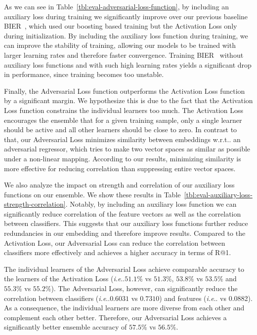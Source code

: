 \documentclass[10pt,journal,compsoc]{IEEEtran}
\makeatletter
\DeclareRobustCommand\onedot{\futurelet\@let@token\@onedot}
\def\@onedot{\ifx\@let@token.\else.\null\fi\xspace}
\def\ie{\emph{i.e}\onedot} \def\Ie{\emph{I.e}\onedot}
\def\wrt{w.r.t\onedot} \def\dof{d.o.f\onedot}
\makeatother
\begin{document}
As we can see in Table~\ref{tbl:eval-adversarial-loss-function}, by including an
auxiliary loss during training we significantly improve over our previous
baseline \ac{BIER}~\cite{opitz2017bier}, which used our boosting based training but the Activation Loss 
only during initialization. By including the auxiliary
loss function during training, we can improve the stability of training,
allowing our models to be trained with larger learning rates and therefore
faster convergence. 
Training \ac{BIER}~\cite{opitz2017bier} without auxiliary loss functions and with such high learning rates
yields a significant drop in performance, since training becomes too unstable.

Finally, the Adversarial Loss
function outperforms the Activation Loss function by a significant margin. We
hypothesize this is due to the fact that the Activation Loss function
constrains the individual learners too much. The Activation Loss encourages 
the ensemble that for a given training sample,
only a single learner should be active and all other learners should be close 
to zero. In contrast to that, our Adversarial Loss minimizes similarity between 
embeddings \wrt an adversarial regressor, which tries to make two vector
spaces as similar as possible under a non-linear mapping. According to our results,
minimizing similarity is more effective for reducing correlation than suppressing entire 
vector spaces.

We also analyze the impact on strength and correlation of our auxiliary loss
functions on our ensemble. We show these results in
Table~\ref{tbl:eval-auxiliary-loss-strength-correlation}. Notably, by including
an auxiliary loss function we can significantly reduce correlation of the
feature vectors as well as the correlation between classifiers. This suggests
that our auxiliary loss functions further reduce redundancies in our embedding
and therefore improve results. Compared to the Activation Loss, our Adversarial Loss
can reduce the correlation between classifiers more effectively and achieves a
higher accuracy in terms of R@1.

The individual learners of the Adversarial Loss achieve comparable accuracy to the learners of the 
Activation Loss (\ie$51.1\%$ vs $51.3\%$, $53.8\%$ vs $53.5\%$ and $55.3\%$ vs $55.2\%$).
The Adversarial Loss, however, can significantly reduce the correlation between classifiers (\ie$0.6031$ vs $0.7310$) and features (\ie 0.0731 vs 0.0882). 
As a consequence, the individual learners are more diverse from each other and complement each other better. Therefore, our Adversarial Loss achieves a significantly better
ensemble accuracy of $57.5\%$ vs $56.5\%$.
\end{document}
